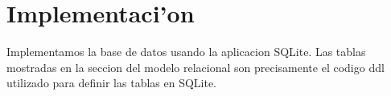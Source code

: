 \section{Implementaci'on}

Implementamos la base de datos usando la aplicacion SQLite. Las tablas mostradas en la seccion del modelo relacional son precisamente el codigo ddl utilizado para definir las tablas en SQLite.